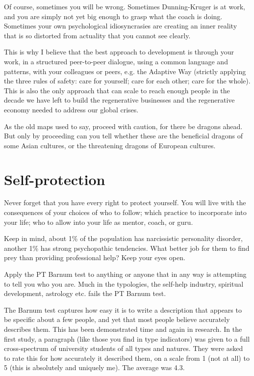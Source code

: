 Of course, sometimes you will be wrong. Sometimes Dunning-Kruger  is at work, and you are simply not yet big enough to grasp what the coach is doing. Sometimes your own psychological idiosyncrasies are creating an inner reality that is so distorted from actuality that you cannot see clearly.


This is why I believe that the best approach to development is through your work, in a structured peer-to-peer dialogue, using a common language and patterns, with your colleagues or peers, e.g. the Adaptive Way (strictly applying the three rules of safety: care for yourself; care for each other; care for the whole). This is also the only approach that can scale to reach enough people in the decade we have left to build the regenerative businesses and the regenerative economy needed to address our global crises.


As the old maps used to say, proceed with caution, for there be dragons ahead. But only by proceeding can you tell whether these are the beneficial dragons of some Asian cultures, or the threatening dragons of European cultures.


\section{Self-protection}
Never forget that you have every right to protect yourself. You will live with the consequences of your choices of who to follow; which practice to incorporate into your life; who to allow into your life as mentor, coach, or guru.


Keep in mind, about 1\% of the population has narcissistic personality disorder, another 1\% has strong psychopathic tendencies. What better job for them to find prey than providing professional help? Keep your eyes open.


Apply the PT Barnum test\cite{wiseman-paranormality} to anything or anyone that in any way is attempting to tell you who you are. Much in the typologies, the self-help industry, spiritual development, astrology etc. fails the PT Barnum test. 


The Barnum test captures how easy it is to write a description that appears to be specific about a few people, and yet that most people believe accurately describes them. This has been demonstrated time and again in research. In the first study, a paragraph (like those you find in type indicators) was given to a full cross-spectrum of university students of all types and natures. They were asked to rate this for how accurately it described them, on a scale from 1 (not at all) to 5 (this is absolutely and uniquely me). The average was 4.3. 


